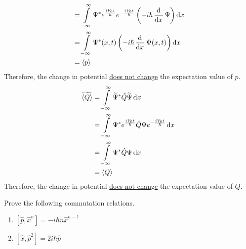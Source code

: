 \documentclass[fleqn, a4paper, 11pt, oneside]{amsart}
\theoremstyle{definition}
\theoremstyle{theorem}
\renewcommand{\emph}{\uline}
\renewcommand{\tilde}{\widetilde}
\begin{document}
\begin{solution}
\begin{enumerate}[leftmargin=*]
\begin{align*}
                                                          & = \int\limits_{-\infty}^{\infty} \Psi^* e^{\frac{i V_0 t}{\hbar}} e^{-\frac{i V_0 t}{\hbar}} \left( -i \hbar \dod{}{x} \Psi \right) \dif x \\
                                                          & = \int\limits_{-\infty}^{\infty} \Psi^*(x,t) \left( -i \hbar \dod{}{x} \Psi(x,t) \right) \dif x                                            \\
                                                          & = \langle p \rangle
			\end{align*}
			Therefore, the change in potential \emph{does not change} the expectation value of $p$.
			\begin{align*}
				\tilde{\langle Q \rangle} & = \int\limits_{-\infty}^{\infty} \tilde{\Psi}^* \hat{Q} \tilde{\Psi} \dif x                                      \\
                                                          & = \int\limits_{-\infty}^{\infty} \Psi^* e^{\frac{i V_0 t}{\hbar}} \hat{Q} \Psi e^{-\frac{i V_0 t}{\hbar}} \dif x \\
                                                          & = \int\limits_{-\infty}^{\infty} \Psi^* \hat{Q} \Psi \dif x                                                      \\
                                                          & = \langle Q \rangle
			\end{align*}
			Therefore, the change in potential \emph{does not change} the expectation value of $Q$.
	\end{enumerate}
\end{solution}

\begin{question}
	Prove the following commutation relations.
	\begin{enumerate}
		\item $\left[ \hat{p},\hat{x}^n \right] = -i \hbar n \hat{x}^{n - 1}$
		\item $\left[ \hat{x},\hat{p}^2 \right] = 2 i \hbar \hat{p}$
	\end{enumerate}
\end{question}
\end{document}
